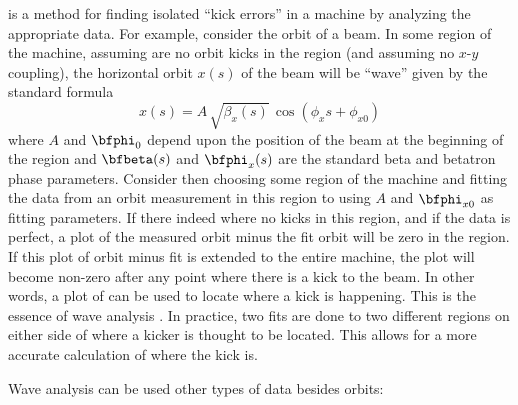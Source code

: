 \documentclass{hitec}     %
\begin{document}
 is a method for finding isolated ``kick errors'' in a machine by analyzing the
appropriate data. For example, consider the orbit of a beam. In some region of the
machine, assuming are no orbit kicks in the region (and assuming no $x$-$y$ coupling), the
horizontal orbit $x(s)$ of the beam will be ``wave'' given by the standard formula
\begin{equation}
  x(s) = A \, \sqrt{\beta_x(s)} \, \cos(\phi_x{s} + \phi_{x0})
  \label{xabpp}
\end{equation}
where $A$ and $\bfphi_0$ depend upon the position of the beam at the beginning of the region and
$\bfbeta(s)$ and $\bfphi_x(s)$ are the standard beta and betatron phase parameters. Consider then
choosing some region of the machine and fitting the data from an orbit measurement in this region to
 using $A$ and $\bfphi_{x0}$ as fitting parameters. If there indeed where no kicks in this
region, and if the data is perfect, a plot of the measured orbit minus the fit orbit will be zero in
the region. If this plot of orbit minus fit is extended to the entire machine, the plot will become
non-zero after any point where there is a kick to the beam. In other words, a plot of  can be used to locate where a kick is happening. This is the essence of wave analysis
\cite{b:phase.coupling.correction}. In practice, two fits are done to two different regions on
either side of where a kicker is thought to be located. This allows for a more accurate calculation
of where the kick is.

Wave analysis can be used other types of data besides orbits:
\begin{table}[h]
\caption[Wave measurement types.]
{Types of measurements that can be used in a wave analysis and the 
types of errors that can be diagnosed.}
\label{t:wave0}
\end{table}
\end{document}
